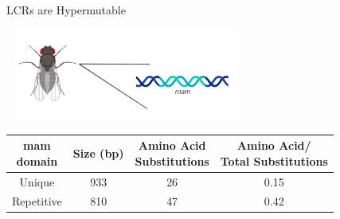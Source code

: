 \documentclass{beamer}
\begin{document}
	\begin{frame}{LCRs are Hypermutable }
		
		
		\begin{center}	
		\includegraphics[width=8cm, height=3cm]{drosophila.png}
		\end{center}
	
		\begin{center}	
		\begin{tabular}{|cccc|}
			\hline
			\makecell{\textbf{mam} \\ \textbf{domain}} & \textbf{Size (bp)} & \makecell{\textbf{Amino Acid} \\ \textbf{Substitutions}} & \makecell{\textbf{Amino Acid/} \\ \textbf{Total Substitutions}}  \\ 
			\hline
			Unique & 933 & 26 & 0.15\\ 
			\hline
			Repetitive & 810 & 47 & 0.42\\ 
			\hline
		\end{tabular}\newline\newline
		\end{center}
	
	\end{frame}
\end{document}
